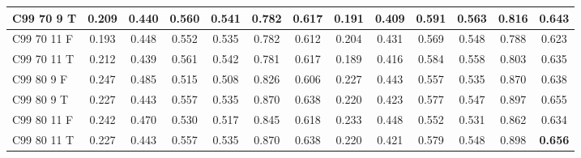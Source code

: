 \documentclass{article}
\begin{document}
\begin{tabular}{|l|c|c|c|c|c|c||c|c|c|c|c|c|}
C99 70  9 T & 0.209 & 0.440 & 0.560 & 0.541 & 0.782 & 0.617 & 0.191 & 0.409 & 0.591 & 0.563 & 0.816 & 0.643\\ \hline
C99 70 11 F & 0.193 & 0.448 & 0.552 & 0.535 & 0.782 & 0.612 & 0.204 & 0.431 & 0.569 & 0.548 & 0.788 & 0.623\\ \hline
C99 70 11 T & 0.212 & 0.439 & 0.561 & 0.542 & 0.781 & 0.617 & 0.189 & 0.416 & 0.584 & 0.558 & 0.803 & 0.635\\ \hline
C99 80  9 F & 0.247 & 0.485 & 0.515 & 0.508 & 0.826 & 0.606 & 0.227 & 0.443 & 0.557 & 0.535 & 0.870 & 0.638\\ \hline
C99 80  9 T & 0.227 & 0.443 & 0.557 & 0.535 & 0.870 & 0.638 & 0.220 & 0.423 & 0.577 & 0.547 & 0.897 & 0.655\\ \hline
C99 80 11 F & 0.242 & 0.470 & 0.530 & 0.517 & 0.845 & 0.618 & 0.233 & 0.448 & 0.552 & 0.531 & 0.862 & 0.634\\ \hline
C99 80 11 T & 0.227 & 0.443 & 0.557 & 0.535 & 0.870 & 0.638 & 0.220 & 0.421 & 0.579 & 0.548 & 0.898 & \textbf{0.656}\\ \hline
\end{tabular} 
\end{document}
